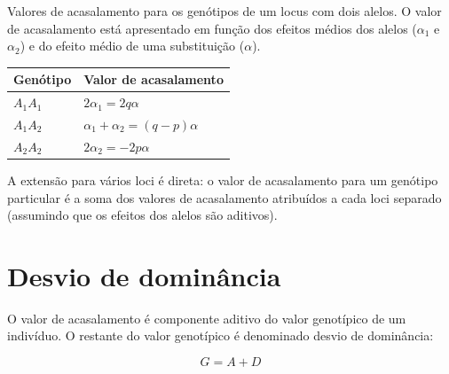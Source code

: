 \documentclass[portuges,]{tufte-handout}
\begin{document}
\begin{margintable}
  \centering
  \selectfont
  \caption{Valores de acasalamento para os genótipos de um locus com
dois alelos. O valor de acasalamento está apresentado em função dos
efeitos médios dos alelos ($\alpha_1$ e $\alpha_2$) e do efeito médio
de uma substituição ($\alpha$).}
  \begin{tabular}{ll}
    \toprule
Genótipo &   Valor de acasalamento \\
    \midrule
$A_1$$A_1$ & $2\alpha_1 = 2q\alpha$ \\
$A_1$$A_2$ & $\alpha_1 + \alpha_2 = (q-p)\alpha$ \\
$A_2$$A_2$ & $2\alpha_2 = -2p\alpha$ \\
    \bottomrule
  \end{tabular}
\end{margintable}

A extensão para vários loci é direta: o valor de acasalamento para um
genótipo particular é a soma dos valores de acasalamento atribuídos a
cada loci separado (assumindo que os efeitos dos alelos são aditivos).

\section{Desvio de dominância}\label{desvio-de-dominuxe2ncia}

O valor de acasalamento é componente aditivo do valor genotípico de um
indivíduo. O restante do valor genotípico é denominado desvio de
dominância:

\[
G = A + D
\]
\end{document}
